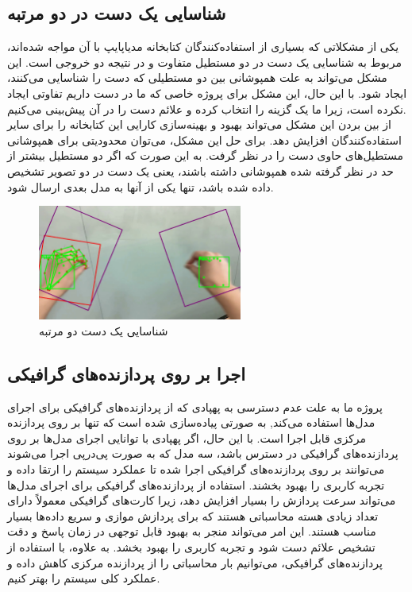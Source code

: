 \subsection{شناسایی یک دست در دو مرتبه}
یکی از مشکلاتی که بسیاری از استفاده‌کنندگان کتابخانه مدیاپایپ با آن مواجه شده‌اند، مربوط به شناسایی یک دست در دو مستطیل متفاوت و در نتیجه دو خروجی است. این مشکل می‌تواند به علت همپوشانی بین دو مستطیلی که دست را 
شناسایی می‌کنند، ایجاد شود. با این حال، این مشکل برای پروژه خاصی که ما در دست داریم تفاوتی ایجاد نکرده است، زیرا ما یک گزینه را انتخاب کرده و علائم دست را در آن پیش‌بینی می‌کنیم.
\\
از بین بردن این مشکل می‌تواند بهبود و بهینه‌سازی کارایی این کتابخانه را برای سایر استفاده‌کنندگان افزایش دهد. برای حل این مشکل، می‌توان محدودیتی برای همپوشانی مستطیل‌های حاوی دست را در نظر گرفت. به این صورت که اگر دو مستطیل بیشتر از حد در نظر گرفته شده 
همپوشانی داشته باشند، یعنی یک دست در دو تصویر تشخیص داده شده باشد، تنها یکی از آنها به مدل بعدی ارسال شود.
\begin{figure}[h]
    \centering
    \includegraphics[width=0.6\textwidth]{multi_boxes.png}
    \caption{شناسایی یک دست دو مرتبه}
\end{figure}


\subsection{اجرا بر روی پردازنده‌های گرافیکی }
پروژه ما  به علت عدم دسترسی به پهپادی که از پردازنده‌های گرافیکی برای اجرای مدل‌ها استفاده می‌کند, به صورتی پیاده‌سازی شده است که تنها بر روی پردازنده مرکزی قابل اجرا است. با این حال، اگر پهپادی با توانایی اجرای مدل‌ها بر روی 
پردازنده‌های گرافیکی در دسترس باشد، سه مدل که به صورت پی‌در‌پی اجرا می‌شوند می‌توانند بر روی پردازنده‌های گرافیکی اجرا شده تا عملکرد سیستم را ارتقا داده و تجربه کاربری را بهبود بخشند. استفاده از پردازنده‌های گرافیکی برای اجرای مدل‌ها می‌تواند 
سرعت پردازش را بسیار افزایش دهد، زیرا کارت‌های گرافیکی معمولاً دارای تعداد زیادی هسته محاسباتی هستند که برای پردازش موازی و سریع داده‌ها بسیار مناسب هستند. این امر می‌تواند منجر به بهبود قابل توجهی در زمان پاسخ و دقت 
تشخیص علائم دست شود و تجربه کاربری را بهبود بخشد. به علاوه، با استفاده از پردازنده‌های گرافیکی، می‌توانیم بار محاسباتی را از پردازنده مرکزی کاهش داده و عملکرد کلی سیستم را بهتر کنیم.

